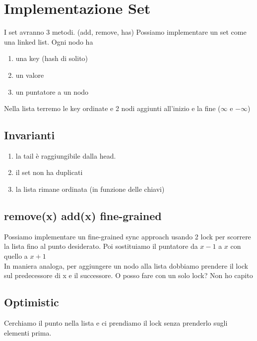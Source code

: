 \documentclass{article}
\begin{document}
\section{Implementazione Set}
I set avranno 3 metodi. (add, remove, has)
Possiamo implementare un set come una linked list. Ogni nodo ha \begin{enumerate}
    \item una key (hash di solito)
    \item un valore
    \item un puntatore a un nodo
\end{enumerate}
Nella lista terremo le key ordinate e 2 nodi aggiunti all'inizio e la fine ($\infty$ e $-\infty$)

\subsection{Invarianti}
\begin{enumerate}
    \item la tail è raggiungibile dalla head.
    \item il set non ha duplicati
    \item la lista rimane ordinata (in funzione delle chiavi)
\end{enumerate}

\subsection{remove(x) add(x) fine-grained}
Possiamo implementare un fine-grained sync approach usando 2 lock per scorrere la lista fino al punto desiderato. Poi sostituiamo il puntatore da $x-1$ a $x$ con quello a $x+1$ \\
In maniera analoga, per aggiungere un nodo alla lista dobbiamo prendere il lock sul predecessore di x e il successore. O posso fare con un solo lock? Non ho capito

\subsection{Optimistic}
Cerchiamo il punto nella lista e ci prendiamo il lock senza prenderlo sugli elementi prima.
\end{document}
